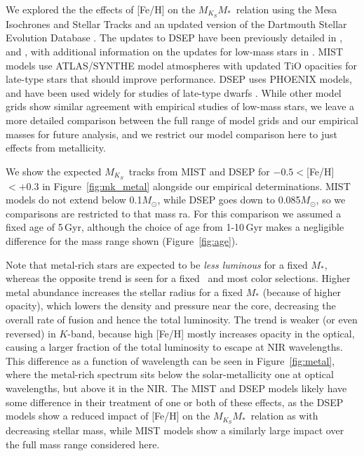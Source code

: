 \documentclass[twocolumn]{aastex62}
\newcommand{\mks}{$M_{K_S}$}
\newcommand{\mmk}{$M_{K_S}$\textendash$M_*$}
\begin{document}
We explored the the effects of [Fe/H] on the \mmk\ relation using the Mesa Isochrones and Stellar Tracks \citep[MIST,][]{MIST0,MIST1} and an updated version of the Dartmouth Stellar Evolution Database \citep[DSEP,][]{Dotter2008}. The updates to DSEP have been previously detailed in \citet{Feiden2013,Feiden2014a}, and \citet{Muirhead2014}, with additional information on the updates for low-mass stars in \citet{Mann2015b}. MIST models use ATLAS/SYNTHE model atmospheres \citep{2004astro.ph..5087C} with updated TiO opacities for late-type stars that should improve performance. DSEP uses PHOENIX \cite{Hauschildt1999,1999ApJ...525..871H} models, and have been used widely for studies of late-type dwarfs \citep[e.g.,][]{Boyajian2012,2015MNRAS.454..593B,2018arXiv180404133K}. While other model grids \citep[e.g.,YaPSI, PARSEC, Lyon][]{Spada2013,Chen2014,BHAC15} show similar agreement with empirical studies of low-mass stars, we leave a more detailed comparison between the full range of model grids and our empirical masses for future analysis, and we restrict our model comparison here to just effects from metallicity. 

We show the expected \mks\ tracks from MIST and DSEP for $-0.5<$[Fe/H]$<+0.3$ in Figure~\ref{fig:mk_metal} alongside our empirical determinations. MIST models do not extend below 0.1$M_\odot$, while DSEP goes down to 0.085$M_\odot$, so we comparisons are restricted to that mass ra. For this comparison we assumed a fixed age of 5\,Gyr, although the choice of age from 1-10\,Gyr makes a negligible difference for the mass range shown (Figure~\ref{fig:age}). 

Note that metal-rich stars are expected to be {\it less luminous} for a fixed $M_*$, whereas the opposite trend is seen for a fixed \teff\ and most color selections. Higher metal abundance increases the stellar radius for a fixed $M_*$ (because of higher opacity), which lowers the density and pressure near the core, decreasing the overall rate of fusion and hence the total luminosity. The trend is weaker (or even reversed) in $K$-band, because high [Fe/H] mostly increases opacity in the optical, causing a larger fraction of the total luminosity to escape at NIR wavelengths. This difference as a function of wavelength can be seen in Figure~\ref{fig:metal}, where the metal-rich spectrum sits below the solar-metallicity one at optical wavelengths, but above it in the NIR. The MIST and DSEP models likely have some difference in their treatment of one or both of these effects, as the DSEP models show a reduced impact of [Fe/H] on the \mmk\ relation as with decreasing stellar mass, while MIST models show a similarly large impact over the full mass range considered here. 
\end{document}
